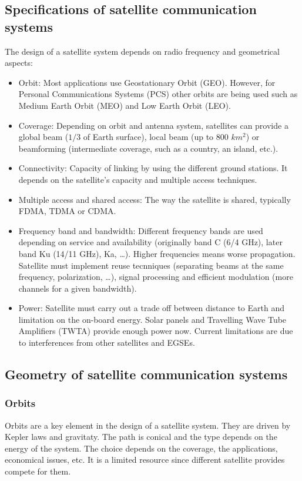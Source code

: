 \documentclass[../main.tex]{subfiles}
\begin{document}
\subsection{Specifications of satellite communication systems}

The design of a satellite system depends on radio frequency and geometrical aspects:
\begin{itemize}
	\item Orbit: Most applications use Geostationary Orbit (GEO). However, for Personal Communications Systems (PCS) other orbits are being used such as Medium Earth Orbit (MEO) and Low Earth Orbit (LEO).
	\item Coverage: Depending on orbit and antenna system, satellites can provide a global beam ($1/3$ of Earth surface), local beam (up to 800 $km^2$) or beamforming (intermediate coverage, such as a country, an island, etc.).
	\item Connectivity: Capacity of linking by using the different ground stations. It depends on the satellite’s capacity and multiple access techniques.
	\item Multiple access and shared access: The way the satellite is shared, typically FDMA, TDMA or CDMA.
	\item Frequency band and bandwidth: Different frequency bands are used depending on service and availability (originally band C (6/4 GHz), later band Ku (14/11 GHz), Ka, \ldots). Higher frequencies means worse propagation. Satellite must implement reuse tecnniques (separating beams at the same frequency, polarization, \ldots), signal processing and efficient modulation (more channels for a given bandwidth).
	\item Power: Satellite must carry out a trade off between distance to Earth and limitation on the on-board energy. Solar panels and Travelling Wave Tube Amplifiers (TWTA) provide enough power now. Current limitations are due to interferences from other satellites and EGSEs.
\end{itemize}

\subsection{Geometry of satellite communication systems}

\subsubsection{Orbits}

Orbits are a key element in the design of a satellite system. They are driven by Kepler laws and gravitaty. The path is conical and the type depends on the energy of the system. The choice depends on the coverage, the applications, economical issues, etc. It is a limited resource since different satellite provides compete for them.
\end{document}
